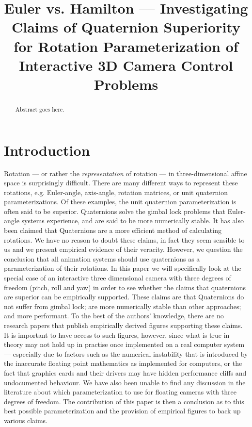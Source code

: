 \documentclass{acm_proc_article-sp}
\title{Euler vs. Hamilton --- Investigating Claims of Quaternion Superiority for Rotation Parameterization of Interactive 3D Camera Control Problems}
\author{}
\date{}
\begin{document}
\maketitle

\begin{abstract}
Abstract goes here.
\end{abstract}



\section{Introduction}

Rotation --- or rather the \emph{representation} of rotation --- in three-dimensional affine space is surprisingly difficult.
There are many different ways to represent these rotations, e.g. Euler-angle, axis-angle, rotation matrices, or unit quaternion parameterizations.
Of these examples, the unit quaternion parameterization is often said to be superior.
Quaternions solve the gimbal lock problems that Euler-angle systems experience, and are said to be more numerically stable.
It has also been claimed that Quaternions are a more efficient method of calculating rotations.
We have no reason to doubt these claims, in fact they seem sensible to us and we present empirical evidence of their veracity.
However, we question the conclusion that all animation systems should use quaternions as a parameterization of their rotations.
In this paper we will specifically look at the special case of an interactive three dimensional camera with three degrees of freedom (pitch, roll and yaw) in order to see whether the claims that quaternions are superior can be empirically supported.
These claims are that Quaternions do not suffer from gimbal lock; are more numerically stable than other approaches; and more performant.
To the best of the authors' knowledge, there are no research papers that publish empirically derived figures supporting these claims.
It is important to have access to such figures, however, since what is true in theory may not hold up in practise once implemented on a real computer system ---
especially due to factors such as the numerical instability that is introduced by the inaccurate floating point mathematics as implemented for computers, or the fact that graphics cards and their drivers may have hidden performance cliffs and undocumented behaviour.
We have also been unable to find any discussion in the literature about which parameterization to use for floating cameras with three degrees of freedom.
The contribution of this paper is then a conclusion as to this best possible parameterization and the provision of empirical figures to back up various claims.
\end{document}
